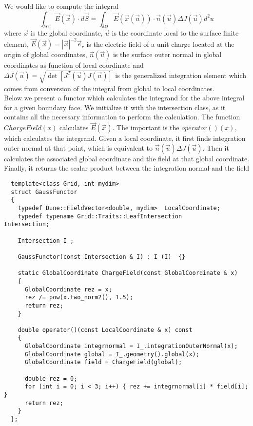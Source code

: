 \noindent
We would like to compute the integral
\[\int_{\delta \Omega} \vec{E}(\vec{x}) \cdot d\vec{S} = \int_{\delta \Omega} \vec{E}(\vec{x}(\vec{u})) \cdot \vec{n}(\vec{u}) \Delta J(\vec{u}) d^2 u \]
\noindent
where $\vec{x}$ is the global coordinate, $\vec{u}$ is the coordinate local to the surface finite element, $\vec{E}(\vec{x}) = |\vec{x}|^{-2} \vec{e}_r$ is the electric field of a unit charge located at the origin of global coordinates, $\vec{n}(\vec{u})$ is the surface outer normal in global coordinates as function of local coordinate and $\Delta J(\vec{u}) = \sqrt{\det [ J^T(\vec{u}) J(\vec{u}) ]}$ is the generalized integration element which comes from conversion of the integral from global to local coordinates. \\

\noindent
Below we present a functor which calculates the integrand for the above integral for a given boundary face. We initialize it with the intersection class, as it contains all the necessary information to perform the calculation. The function $ChargeField(x)$ calculates $\vec{E}(\vec{x})$. The important is the $operator()(x)$, which calculates the integrand. Given a local coordinate, it first finds integration outer normal at that point, which is equivalent to $\vec{n}(\vec{u}) \Delta J(\vec{u})$. Then it calculates the associated global coordinate and the field at that global coordinate. Finally, it returns the scalar product between the integration normal and the field \\


\begin{mybox}
\begin{lstlisting}
  template<class Grid, int mydim>
  struct GaussFunctor
  {
    typedef Dune::FieldVector<double, mydim>  LocalCoordinate;
    typedef typename Grid::Traits::LeafIntersection               Intersection;

    Intersection I_;

    GaussFunctor(const Intersection & I) : I_(I)  {}

    static GlobalCoordinate ChargeField(const GlobalCoordinate & x)
    {
      GlobalCoordinate rez = x;
      rez /= pow(x.two_norm2(), 1.5);
      return rez;
    }

    double operator()(const LocalCoordinate & x) const
    {
      GlobalCoordinate integrnormal = I_.integrationOuterNormal(x);
      GlobalCoordinate global = I_.geometry().global(x);
      GlobalCoordinate field = ChargeField(global);

      double rez = 0;
      for (int i = 0; i < 3; i++) { rez += integrnormal[i] * field[i]; }
      return rez;
    }
  };
\end{lstlisting}
\end{mybox}

